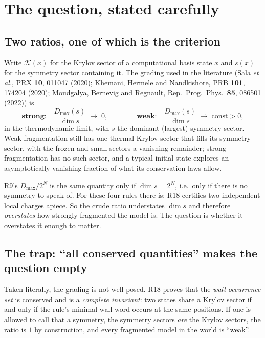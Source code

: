 \documentclass[11pt]{article}
\theoremstyle{plain}
\begin{document}
\tableofcontents

\section{The question, stated carefully}

\subsection{Two ratios, one of which is the criterion}

Write $\mathcal{K}(x)$ for the Krylov sector of a computational basis state $x$
and $s(x)$ for the symmetry sector containing it. The grading used in the
literature (Sala \emph{et al.}, PRX \textbf{10}, 011047 (2020); Khemani,
Hermele and Nandkishore, PRB \textbf{101}, 174204 (2020); Moudgalya, Bernevig
and Regnault, Rep.\ Prog.\ Phys.\ \textbf{85}, 086501 (2022)) is
\[
\textbf{strong:}\quad \frac{D_{\max}(s)}{\dim s}\;\longrightarrow\;0,
\qquad\qquad
\textbf{weak:}\quad \frac{D_{\max}(s)}{\dim s}\;\longrightarrow\;\text{const}>0 ,
\]
in the thermodynamic limit, with $s$ the dominant (largest) symmetry sector.
Weak fragmentation still has one thermal Krylov sector that fills its symmetry
sector, with the frozen and small sectors a vanishing remainder; strong
fragmentation has no such sector, and a typical initial state explores an
asymptotically vanishing fraction of what its conservation laws allow.

R9's $D_{\max}/2^N$ is the same quantity only if $\dim s = 2^N$, i.e.\ only if
there is no symmetry to speak of. For these four rules there is: R18 certifies
two independent local charges apiece. So the crude ratio understates
$\dim s$ and therefore \emph{overstates} how strongly fragmented the model is.
The question is whether it overstates it enough to matter.

\subsection{The trap: ``all conserved quantities'' makes the question empty}

Taken literally, the grading is not well posed. R18 proves that the
\emph{wall-occurrence set} is conserved and is a \emph{complete invariant}: two
states share a Krylov sector if and only if the rule's minimal wall word occurs
at the same positions. If one is allowed to call that a symmetry, the symmetry
sectors \emph{are} the Krylov sectors, the ratio is $1$ by construction, and
every fragmented model in the world is ``weak''.
\end{document}
